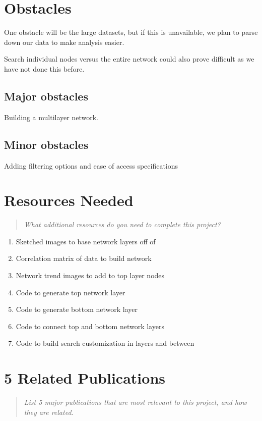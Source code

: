 \documentclass{proc}
\begin{document}
\section{Obstacles}

One obstacle will be the large datasets, but if this is unavailable, we plan to parse down our data to make analysis easier.

Search individual nodes versus the entire network could also prove difficult as we have not done this before.

\subsection{Major obstacles} %

Building a multilayer network.

\subsection{Minor obstacles}

Adding filtering options and ease of access specifications

\section{Resources Needed}
\begin{quote}
\textit{What additional resources do you need to complete this project?}
\end{quote}

\begin{enumerate}
    \item Sketched images to base network layers off of
    \item Correlation matrix of data to build network
    \item Network trend images to add to top layer nodes
    \item Code to generate top network layer
    \item Code to generate bottom network layer
    \item Code to connect top and bottom network layers
    \item Code to build search customization in layers and between
\end{enumerate}

\section{5 Related Publications}
\begin{quote}
\textit{List 5 major publications that are most relevant to this project, and how they are related.}
\end{quote}
\end{document}
